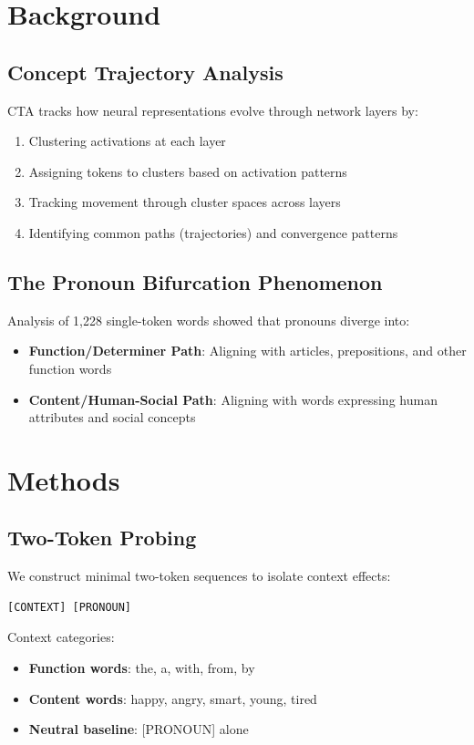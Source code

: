 \documentclass[11pt]{article}
\begin{document}
\section{Background}

\subsection{Concept Trajectory Analysis}

CTA tracks how neural representations evolve through network layers by:
\begin{enumerate}
\item Clustering activations at each layer
\item Assigning tokens to clusters based on activation patterns
\item Tracking movement through cluster spaces across layers
\item Identifying common paths (trajectories) and convergence patterns
\end{enumerate}

\subsection{The Pronoun Bifurcation Phenomenon}

Analysis of 1,228 single-token words showed that pronouns diverge into:
\begin{itemize}
\item \textbf{Function/Determiner Path}: Aligning with articles, prepositions, and other function words
\item \textbf{Content/Human-Social Path}: Aligning with words expressing human attributes and social concepts
\end{itemize}

\section{Methods}

\subsection{Two-Token Probing}

We construct minimal two-token sequences to isolate context effects:
\begin{verbatim}
[CONTEXT] [PRONOUN]
\end{verbatim}

Context categories:
\begin{itemize}
\item \textbf{Function words}: the, a, with, from, by
\item \textbf{Content words}: happy, angry, smart, young, tired
\item \textbf{Neutral baseline}: [PRONOUN] alone
\end{itemize}
\end{document}

